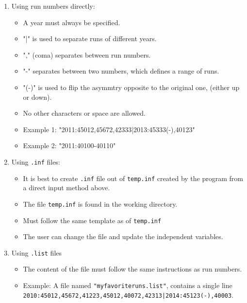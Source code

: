\documentclass[10pt,letterpaper,oneside]{article}
\begin{document}
\begin{enumerate}
\item Using run numbers directly:
\begin{itemize}
\item  A year must always be specified.
\item  "|" is used to separate runs of different years.
\item  "," (coma) separates between run numbers.
\item  "-" separates between two numbers, which defines a range of runs.
\item  "(-)" is used to flip the asymmtry opposite to the original one, (either up or down). 
\item  No other characters or space are allowed. 
\item Example 1: "2011:45012,45672,42333|2013:45333(-),40123"
\item Example 2: "2011:40100-40110"
\end{itemize}
\item Using \verb+.inf+ files:
\begin{itemize}
\item It is best to create \verb+.inf+ file out of \verb+temp.inf+ created by the program from a direct input method above.
\item The file \verb+temp.inf+ is found in the working directory.
\item Must follow the same template as of \verb+temp.inf+
\item The user can change the file and update the independent variables.
\end{itemize}
\item Using \verb+.list+ files 
\begin{itemize}
\item The content of the file must follow the same instructions as run numbers.
\item Example: A file named \verb+"myfavoriteruns.list"+, contains a single line\\ \verb+2010:45012,45672,41223,45012,40072,42313|2014:45123(-),40003+.

\end{itemize}
\end{enumerate}
\end{document}
